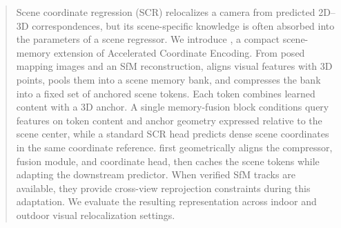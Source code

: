 \begin{abstract}
Scene coordinate regression (SCR) relocalizes a camera from predicted 2D--3D correspondences, but its scene-specific knowledge is often absorbed into the parameters of a scene regressor. We introduce \method{}, a compact scene-memory extension of Accelerated Coordinate Encoding. From posed mapping images and an SfM reconstruction, \method{} aligns visual features with 3D points, pools them into a scene memory bank, and compresses the bank into a fixed set of anchored scene tokens. Each token combines learned content with a 3D anchor. A single memory-fusion block conditions query features on token content and anchor geometry expressed relative to the scene center, while a standard SCR head predicts dense scene coordinates in the same coordinate reference. \method{} first geometrically aligns the compressor, fusion module, and coordinate head, then caches the scene tokens while adapting the downstream predictor. When verified SfM tracks are available, they provide cross-view reprojection constraints during this adaptation. We evaluate the resulting representation across indoor and outdoor visual relocalization settings.
\end{abstract}
